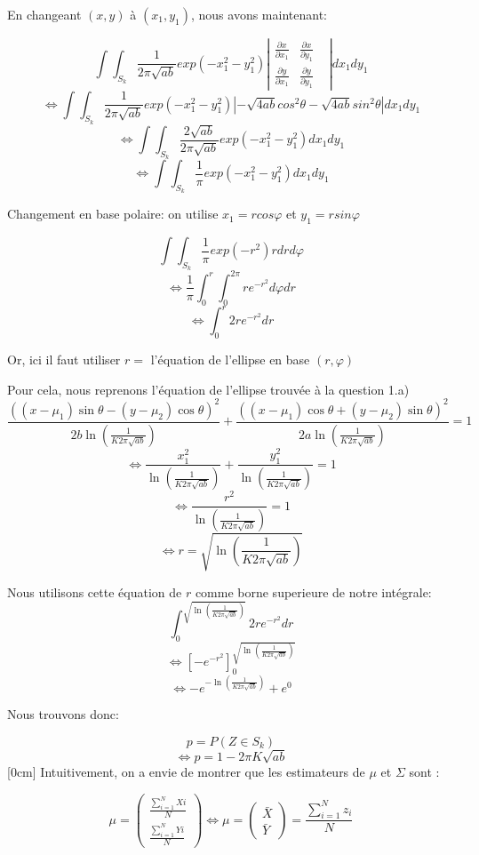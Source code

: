 \documentclass{article}
\begin{document}
En changeant $(x,y)$ à $(x_1,y_1)$, nous avons maintenant:

$$\int\int_{S_k}^{} \frac{1}{2\pi\sqrt{ab}}exp(-x_1^2-y_1^2)\left| \begin{matrix}\frac{\partial x}{\partial x_1}
    &  \frac{\partial x}{\partial y_1}
    &  \\\frac{\partial y}{\partial x_1}
    & \frac{\partial y}{\partial y_1}
\end{matrix} \right|dx_1dy_1$$
$$\Leftrightarrow \int\int_{S_k}^{} \frac{1}{2\pi\sqrt{ab}}exp(-x_1^2-y_1^2)\left| -\sqrt{4ab}cos^2\theta -\sqrt{4ab}sin^2\theta\right|dx_1dy_1$$
$$\Leftrightarrow \int\int_{S_k}^{} \frac{2\sqrt{ab}}{2\pi\sqrt{ab}}exp(-x_1^2-y_1^2)dx_1dy_1$$
$$\Leftrightarrow \int\int_{S_k}^{} \frac{1}{\pi}exp(-x_1^2-y_1^2)dx_1dy_1$$

Changement en base polaire: on utilise $x_1=rcos\varphi$ et $y_1=rsin\varphi$

$$\int\int_{S_k}^{} \frac{1}{\pi}exp(-r^2)rdrd\varphi$$
$$\Leftrightarrow \frac{1}{\pi}\int_{0}^{r}\int_{0}^{2\pi} re^{-r^2}d\varphi dr$$
$$\Leftrightarrow \int_{0}^{r} 2re^{-r^2} dr$$

Or, ici il faut utiliser $r=$ l'équation de l'ellipse en base $(r,\varphi)$

Pour cela, nous reprenons l'équation de l'ellipse trouvée à la question 1.a)
$$\frac{((x-\mu_1)\sin\theta-(y-\mu_2)\cos\theta)^{2}}{2b\ln(\frac{1}{K2\pi\sqrt{ab}})}+\frac{((x-\mu_1)\cos\theta+(y-\mu_2)\sin\theta)^{2}}{2a\ln(\frac{1}{K2\pi\sqrt{ab}})}=1$$
$$\Leftrightarrow \frac{x_1^2}{\ln(\frac{1}{K2\pi\sqrt{ab}})}+\frac{y_1^2}{\ln(\frac{1}{K2\pi\sqrt{ab}})}=1$$
$$\Leftrightarrow \frac{r^2}{\ln(\frac{1}{K2\pi\sqrt{ab}})}=1$$
$$\Leftrightarrow r=\sqrt{\ln(\frac{1}{K2\pi\sqrt{ab}})}$$

Nous utilisons cette équation de $r$ comme borne superieure de notre intégrale:
$$\int_{0}^{\sqrt{\ln(\frac{1}{K2\pi\sqrt{ab}})}} 2re^{-r^2} dr$$
$$\Leftrightarrow \left[ -e^{-r^2} \right]_{0}^{\sqrt{\ln(\frac{1}{K2\pi\sqrt{ab}})}}$$
$$\Leftrightarrow -e^{-\ln(\frac{1}{K2\pi\sqrt{ab}})}+e^0$$

Nous trouvons donc:

$$p=P(Z \in S_k)$$
$$\Leftrightarrow p=1-2\pi K\sqrt{ab}$$
$$$$
\reversemarginpar{}[0cm]
Intuitivement, on a envie de montrer que les estimateurs de $\mu$ et $\Sigma$ sont :

\[
\mu = \begin{pmatrix} \frac{\sum_{i=1}^{N}Xi}{N} \\ \frac{\sum_{i=1}^{N}Yi}{N} \end{pmatrix} \Leftrightarrow \mu = \begin{pmatrix} \bar{X} \\ \bar{Y} \end{pmatrix} = \frac{\sum_{i=1}^{N}z_i}{N}
\]
\end{document}
